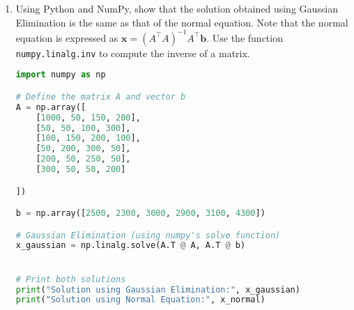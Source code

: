 \documentclass{article}
\begin{document}
\begin{enumerate}
    \item Using Python and NumPy, show that the solution obtained using Gaussian Elimination is the same as that of the normal equation. Note that the normal equation is expressed as \( \mathbf{x} = (A^\top A)^{-1} A^\top \mathbf{b} \). Use the function \texttt{numpy.linalg.inv} to compute the inverse of a matrix.
\begin{lstlisting}[language=Python]
import numpy as np

# Define the matrix A and vector b
A = np.array([
    [1000, 50, 150, 200],
    [50, 50, 100, 300],
    [100, 150, 200, 100],
    [50, 200, 300, 50],
    [200, 50, 250, 50],
    [300, 50, 50, 200]

])

b = np.array([2500, 2300, 3000, 2900, 3100, 4300])

# Gaussian Elimination (using numpy's solve function)
x_gaussian = np.linalg.solve(A.T @ A, A.T @ b)


# Print both solutions
print("Solution using Gaussian Elimination:", x_gaussian)
print("Solution using Normal Equation:", x_normal)

\end{lstlisting}


\end{enumerate}
\end{document}
